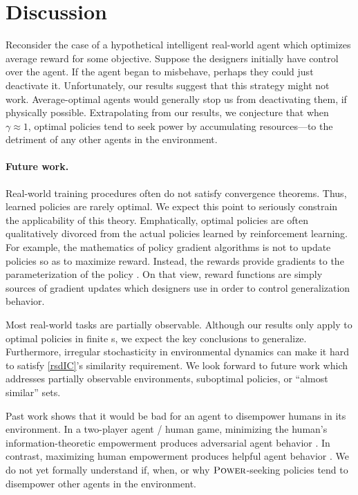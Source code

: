 \section{Discussion} \label{sec:discussion}
Reconsider the case of a hypothetical intelligent real-world agent which optimizes average reward for some objective. Suppose the designers initially have control over the agent. If the agent began to misbehave, perhaps they could just deactivate it. Unfortunately, our results suggest that this strategy might not work. Average-optimal agents would generally stop us from deactivating them, if physically possible. Extrapolating from our results, we conjecture that when $\gamma\approx 1$, optimal policies tend to seek power by accumulating resources—to the detriment of any other agents in the environment.

\paragraph{Future work.}
Real-world training procedures often do not satisfy {\rl} convergence theorems. Thus, learned policies are rarely optimal. We expect this point to seriously constrain the applicability of this theory. Emphatically, optimal policies are often qualitatively divorced from the actual policies learned by reinforcement learning. For example, the mathematics of policy gradient algorithms is not to update policies so as to maximize reward. Instead, the rewards provide gradients to the parameterization of the policy \citep{rewardNotOpt}. On that view, reward functions are simply sources of gradient updates which designers use in order to control generalization behavior. 

Most real-world tasks are partially observable. Although our results only apply to optimal policies in finite {\mdp}s, we expect the key conclusions to generalize. Furthermore, irregular stochasticity in environmental dynamics can make it hard to satisfy \cref{rsdIC}'s similarity requirement. We look forward to future work which addresses partially observable environments, suboptimal policies, or ``almost similar'' {\rsd} sets.  

Past work shows that it would be bad for an agent to disempower humans in its environment. In a two-player agent / human game, minimizing the human's information-theoretic empowerment \citep{salge_empowermentintroduction_2014} produces  adversarial agent behavior \citep{adversary}. In contrast,  maximizing human empowerment produces helpful agent behavior  \citep{salge2017empowerment, guckelsberger2016intrinsically,du2020ave}. We do not yet formally understand if, when, or why $\text{\upshape\textsc{Power}}$-seeking policies tend to disempower other agents in the environment.

